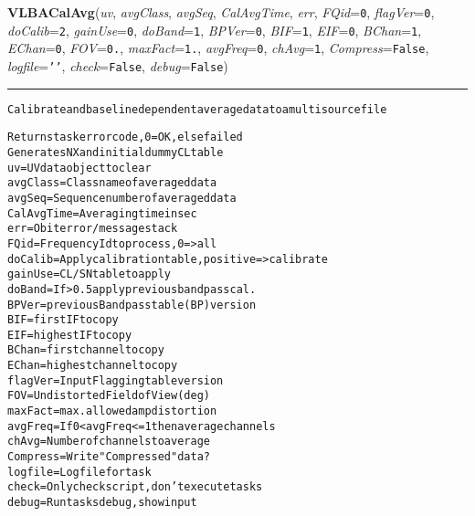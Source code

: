     \label{VLBACal:VLBACalAvg}
    \vspace{0.5ex}

    \begin{boxedminipage}{\textwidth}

    \raggedright \textbf{VLBACalAvg}(\textit{uv}, \textit{avgClass}, \textit{avgSeq}, \textit{CalAvgTime}, \textit{err}, \textit{FQid}=\texttt{0\-}, \textit{flagVer}=\texttt{0\-}, \textit{doCalib}=\texttt{2\-}, \textit{gainUse}=\texttt{0\-}, \textit{doBand}=\texttt{1\-}, \textit{BPVer}=\texttt{0\-}, \textit{BIF}=\texttt{1\-}, \textit{EIF}=\texttt{0\-}, \textit{BChan}=\texttt{1\-}, \textit{EChan}=\texttt{0\-}, \textit{FOV}=\texttt{0\-.\-}, \textit{maxFact}=\texttt{1\-.\-}, \textit{avgFreq}=\texttt{0\-}, \textit{chAvg}=\texttt{1\-}, \textit{Compress}=\texttt{F\-a\-l\-s\-e\-}, \textit{logfile}=\texttt{'\-'\-}, \textit{check}=\texttt{F\-a\-l\-s\-e\-}, \textit{debug}=\texttt{F\-a\-l\-s\-e\-})

    \vspace{-1.5ex}

    \rule{\textwidth}{0.5\fboxrule}
\begin{alltt}
Calibrate and baseline dependent average data to a multisource file

Returns task error code, 0=OK, else failed
Generates NX and initial dummy CL table
uv         = UV data object to clear
avgClass   = Class name of averaged data
avgSeq     = Sequence number of averaged data
CalAvgTime = Averaging time in sec
err        = Obit error/message stack
FQid       = Frequency Id to process, 0={\textgreater}all
doCalib    = Apply calibration table, positive={\textgreater}calibrate
gainUse    = CL/SN table to apply
doBand     = If {\textgreater}0.5 apply previous bandpass cal.
BPVer      = previous Bandpass table (BP) version
BIF        = first IF to copy
EIF        = highest IF to copy
BChan      = first channel to copy
EChan      = highest channel to copy
flagVer    = Input Flagging table version
FOV        = Undistorted Field of View (deg)
maxFact    = max. allowed amp distortion
avgFreq    = If 0 {\textless} avgFreq {\textless}= 1 then average channels
chAvg      = Number of channels to average
Compress   = Write "Compressed" data?
logfile    = Log file for task
check      = Only check script, don't execute tasks
debug      = Run tasks debug, show input\end{alltt}

    \vspace{1ex}

    \end{boxedminipage}

